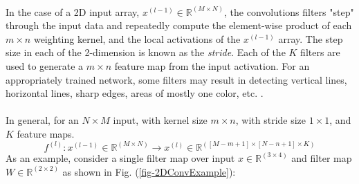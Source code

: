 \documentclass[12pt,letterpaper]{article}
\begin{document}
\paragraph*{}In the case of a 2D input array, $x^{(l-1)} \in \mathbb{R}^{(M \times N)}$, the convolutions filters "step" through the input data and repeatedly compute the element-wise product of each $m \times n$ weighting kernel, and the local activations of the $x^{(l-1)}$ array. The step size in each of the 2-dimension is known as the \textit{stride}. Each of the $K$ filters are used to generate a $m \times n$ feature map from the input activation. For an appropriately trained network, some filters may result in detecting vertical lines, horizontal lines, sharp edges, areas of mostly one color, etc. \cite{Geron,Loy}.

\paragraph*{}In general, for an $N \times M$ input, with kernel size $m \times n$, with stride size $1 \times 1$, and $K$ feature maps.
\begin{equation}
f^{(l)} : x^{(l-1)} \in \mathbb{R}^{(M \times N)} \rightarrow
x^{(l)} \in \mathbb{R}^{([M-m+1] \times [N-n+1] \times K)}
\end{equation}
As an example, consider a single filter map over input $x \in \mathbb{R}^{(3 \times 4)}$ and filter map $W \in \mathbb{R}^{(2 \times 2)}$ as shown in Fig. (\ref{fig-2DConvExample}):
\end{document}
